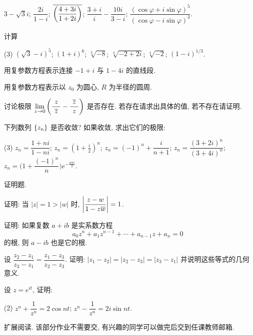 \begin{homework}
\begin{exlist}
\begin{tasks}
          \task $3-\sqrt 3i$;
          \task $\dfrac{2i}{1-i}$;
          \task $\overline{\biggl(\dfrac{4+3i}{1+2i}\biggr)}$;
          \task $\dfrac{3+i}{i}-\dfrac{10i}{3-i}$;
          \task $\dfrac{(\cos \varphi+i\sin \varphi)^5}{(\cos \varphi-i\sin \varphi)^3}$.
        \end{tasks}
      \item 计算
        \begin{tasks}(3)
          \task $(\sqrt3-i)^5$;
          \task $(1+i)^6$;
          \task $\sqrt[3]{-8}$;
          \task $\sqrt[4]{-2+2i}$;
          \task $\sqrt[4]{-2}$;
          \task $(1-i)^{1/3}$.
        \end{tasks}
      \item 用复参数方程表示连接 $-1+i$ 与 $1-4i$ 的直线段.
      \item 用复参数方程表示以 $z_0$ 为圆心, $R$ 为半径的圆周.
      \item 讨论极限 $\displaystyle\lim_{z\to0}\left(\frac{z}{~\overline z~}-\frac{~\overline z~}z\right)$ 是否存在. 若存在请求出具体的值, 若不存在请证明.
      \item 下列数列 ${\left\{z_n\right\}}$ 是否收敛? 如果收敛, 求出它们的极限:
        \begin{tasks}(3)
          \task $z_n=\dfrac{1+ni}{1-ni}$;
          \task $\displaystyle z_n=\left(1+\frac i2\right)^n$;
          \task $z_n=(-1)^n+\dfrac{i}{n+1}$;
          \task $z_n=\dfrac{(3+2i)^n}{(3+4i)^n}$;
          \task $z_n=\biggl(1+\dfrac{(-1)^n}n\biggr)e^{-\frac{n\pi i}2}$.
        \end{tasks}
    \end{exlist}
  \item 证明题.
    \begin{exlist}
      \item 证明: 当 $|z|=1>|w|$ 时, $\left|\dfrac{z-w}{1-z\overline w}\right|=1$.
      \item 证明: 如果复数 $a+ib$ 是实系数方程
      	\[a_0z^n+a_1z^{n-1}+\cdots+a_{n-1}z+a_n=0\]
      	的根, 则 $a-ib$ 也是它的根.
      \item 设 $\dfrac{z_2-z_1}{z_3-z_1}=\dfrac{z_1-z_3}{z_2-z_3}$. 证明: $|z_1-z_2|=|z_2-z_3|=|z_3-z_1|$ 并说明这些等式的几何意义.
      \item 设 $z=e^{it}$, 证明:\begin{tasks}(2)
          \task $z^n+\dfrac1{z^n}=2\cos{nt}$;
          \task $z^n-\dfrac1{z^n}=2i\sin{nt}$.
        \end{tasks}
    \end{exlist}
  \item 扩展阅读. 该部分作业不需要交, 有兴趣的同学可以做完后交到任课教师邮箱.

\end{homework}
